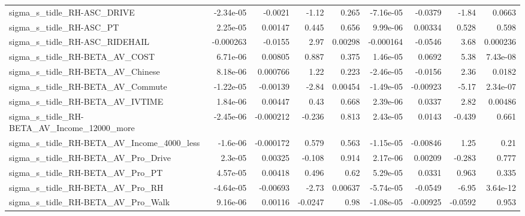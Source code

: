 \begin{tabular}{lrrrrrrrr}
sigma\_s\_tidle\_RH-ASC\_DRIVE                         &   -2.34e-05 &      -0.0021 &     -1.12 &    0.265 &  -7.16e-05 &     -0.0379 &        -1.84 &        0.0663 \\
sigma\_s\_tidle\_RH-ASC\_PT                            &    2.25e-05 &      0.00147 &     0.445 &    0.656 &   9.99e-06 &     0.00334 &        0.528 &         0.598 \\
sigma\_s\_tidle\_RH-ASC\_RIDEHAIL                      &   -0.000263 &      -0.0155 &      2.97 &  0.00298 &  -0.000164 &     -0.0546 &         3.68 &      0.000236 \\
sigma\_s\_tidle\_RH-BETA\_AV\_COST                      &    6.71e-06 &      0.00805 &     0.887 &    0.375 &   1.46e-05 &      0.0692 &         5.38 &      7.43e-08 \\
sigma\_s\_tidle\_RH-BETA\_AV\_Chinese                   &    8.18e-06 &     0.000766 &      1.22 &    0.223 &  -2.46e-05 &     -0.0156 &         2.36 &        0.0182 \\
sigma\_s\_tidle\_RH-BETA\_AV\_Commute                   &   -1.22e-05 &     -0.00139 &     -2.84 &  0.00454 &  -1.49e-05 &    -0.00923 &        -5.17 &      2.34e-07 \\
sigma\_s\_tidle\_RH-BETA\_AV\_IVTIME                    &    1.84e-06 &      0.00447 &      0.43 &    0.668 &   2.39e-06 &      0.0337 &         2.82 &       0.00486 \\
sigma\_s\_tidle\_RH-BETA\_AV\_Income\_12000\_more         &   -2.45e-06 &    -0.000212 &    -0.236 &    0.813 &   2.43e-05 &      0.0143 &       -0.439 &         0.661 \\
sigma\_s\_tidle\_RH-BETA\_AV\_Income\_4000\_less          &    -1.6e-06 &    -0.000172 &     0.579 &    0.563 &  -1.15e-05 &    -0.00846 &         1.25 &          0.21 \\
sigma\_s\_tidle\_RH-BETA\_AV\_Pro\_Drive                 &     2.3e-05 &      0.00325 &    -0.108 &    0.914 &   2.17e-06 &     0.00209 &       -0.283 &         0.777 \\
sigma\_s\_tidle\_RH-BETA\_AV\_Pro\_PT                    &    4.57e-05 &      0.00418 &     0.496 &     0.62 &   5.29e-05 &      0.0331 &        0.963 &         0.335 \\
sigma\_s\_tidle\_RH-BETA\_AV\_Pro\_RH                    &   -4.64e-05 &     -0.00693 &     -2.73 &  0.00637 &  -5.74e-05 &     -0.0549 &        -6.95 &      3.64e-12 \\
sigma\_s\_tidle\_RH-BETA\_AV\_Pro\_Walk                  &    9.16e-06 &      0.00116 &   -0.0247 &     0.98 &  -1.08e-05 &    -0.00925 &      -0.0592 &         0.953 \\

\end{tabular}
